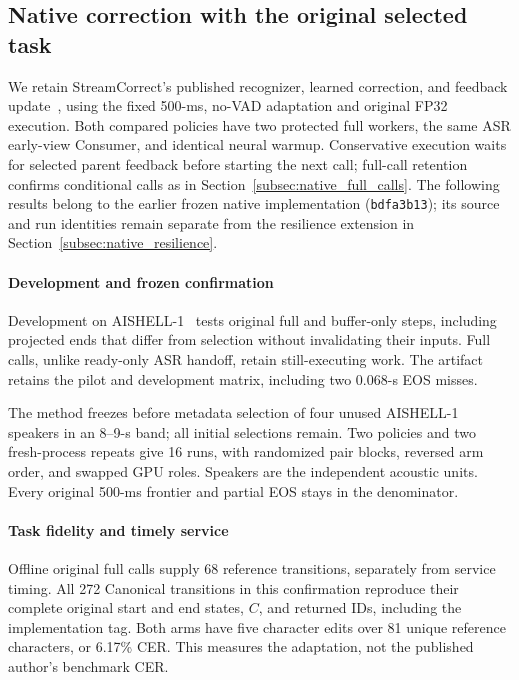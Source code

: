 \subsection{Native correction with the original selected task}
\label{subsec:native_retention_eval}
We retain StreamCorrect's published recognizer, learned correction, and
feedback update~\cite{vu2026streamcorrect}, using the fixed 500-ms, no-VAD
adaptation and original FP32 execution. Both compared policies have two
protected full workers, the same ASR early-view Consumer, and identical
neural warmup. Conservative execution waits for selected parent feedback
before starting the next call; full-call retention confirms conditional
calls as in Section~\ref{subsec:native_full_calls}.
The following results belong to the earlier frozen native implementation
(\texttt{bdfa3b13}); its source and run identities remain separate from
the resilience extension in Section~\ref{subsec:native_resilience}.

\paragraph{Development and frozen confirmation}
Development on AISHELL-1~\cite{bu2017aishell} tests original full and
buffer-only steps, including projected ends that differ from selection
without invalidating their inputs. Full calls, unlike ready-only ASR
handoff, retain still-executing work. The artifact retains the pilot and
development matrix, including two 0.068-s EOS misses.

The method freezes before metadata selection of four unused AISHELL-1
speakers in an 8--9-s band; all initial selections remain. Two policies
and two fresh-process repeats give 16 runs, with randomized pair blocks,
reversed arm order, and swapped GPU roles. Speakers are the independent
acoustic units. Every original 500-ms frontier and partial EOS stays in
the denominator.

\paragraph{Task fidelity and timely service}
Offline original full calls supply 68 reference transitions, separately
from service timing. All 272 Canonical transitions in this confirmation reproduce
their complete original start and end states, $C$, and returned IDs,
including the implementation tag. Both arms have five character edits
over 81 unique reference characters, or 6.17\% CER. This measures the
adaptation, not the published author's benchmark CER.

